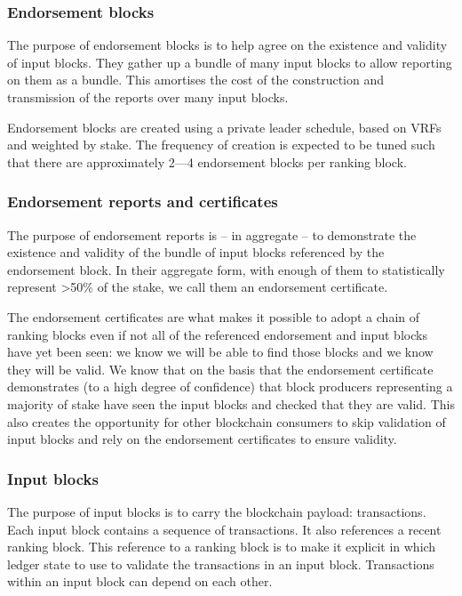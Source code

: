 \documentclass[11pt,a4paper]{article}
\begin{document}
\subsubsection{Endorsement blocks}
The purpose of endorsement blocks is to help
agree on the existence and validity of input blocks. They gather up a bundle of
many input blocks to allow reporting on them as a bundle. This amortises the
cost of the construction and transmission of the reports over many input blocks.

Endorsement blocks are created using a private leader schedule, based on VRFs
and weighted by stake. The frequency of creation is expected to be tuned such
that there are approximately 2---4 endorsement blocks per ranking block.

\subsubsection{Endorsement reports and certificates}
The purpose of endorsement reports is -- in aggregate -- to demonstrate the
existence and validity of the bundle of input blocks referenced by the
endorsement block. In their aggregate form, with enough of them to
statistically represent \textgreater{}50\% of the stake, we call them an
endorsement certificate.

The endorsement certificates are what makes it possible to adopt a chain of
ranking blocks even if not all of the referenced endorsement and input blocks
have yet been seen: we know we will be able to find those blocks and we know
they will be valid. We know that on the basis that the endorsement certificate
demonstrates (to a high degree of confidence) that block producers representing
a majority of stake have seen the input blocks and checked that they are valid.
This also creates the opportunity for other blockchain consumers to skip
validation of input blocks and rely on the endorsement certificates to ensure
validity.

\subsubsection{Input blocks}
The purpose of input blocks is to carry the blockchain
payload: transactions. Each input block contains a sequence of transactions. It
also references a recent ranking block. This reference to a ranking block is to
make it explicit in which ledger state to use to validate the transactions in
an input block. Transactions within an input block can depend on each other.
\end{document}
